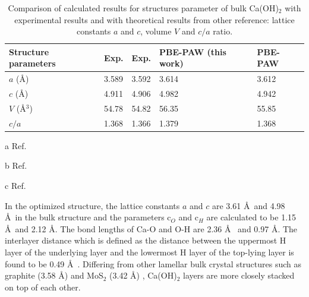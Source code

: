 \begin{table}[htbp]
\centering
\caption{\label{tab:str_caoh2}
Comparison of calculated results for structures parameter of bulk Ca(OH)$_2$ with experimental results and with theoretical results from other reference: lattice constants 
$a$ and $c$, volume $V$ and $c/a$ ratio. }
\begin{threeparttable}
\begin{tabularx}{0.92\linewidth}{X|XXXX}
\hline\hline
Structure parameters & Exp. \tnote{a} & Exp. \tnote{b} & PBE-PAW (this work) & PBE-PAW \tnote{c}  \\
\hline

$a$ (\AA)                   & 3.589 & 3.592 & 3.614 & 3.612 \\
$c$ (\AA)                   & 4.911 & 4.906 & 4.982 & 4.942 \\
$V$ (\AA$^3$)               & 54.78 & 54.82 & 56.35 & 55.85 \\
$c/a$                       & 1.368 & 1.366 & 1.379 & 1.368 \\

\hline\hline

\end{tabularx}
\begin{tablenotes}
\begin{footnotesize}
\item[a]Ref. \cite{exp.1}
\item[b]Ref. \cite{exp.2}
\item[c]Ref. \cite{Pishtshev}
\end{footnotesize}
\end{tablenotes}
\end{threeparttable}
\end{table}

In the optimized structure, the lattice constants $a$ and $c$ are 3.61 \AA~and 4.98 \AA~in the bulk structure and the parameters c$_O$ and c$_H$ are calculated to be 1.15 \AA~and 2.12 \AA . The bond lengths of Ca-O and O-H are 2.36 \AA~ and 0.97 \AA . The interlayer distance which is defined as the distance between the uppermost H layer of the underlying layer and the lowermost H layer  of the top-lying layer is found to be 0.49 \AA~. Differing from other lamellar bulk crystal structures such as graphite (3.58 \AA) and MoS$_{2}$ (3.42 \AA)\cite{can} , Ca(OH)$_{2}$ layers are more closely stacked on top of each other. 

